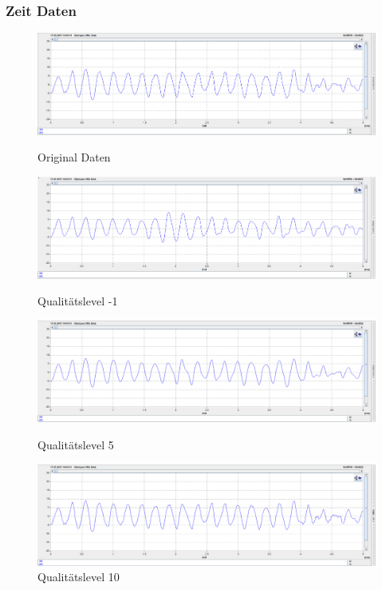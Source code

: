 \documentclass{article}
\begin{document}
{		
		\subsubsection{Zeit Daten}
		
			\begin{figure}
				
				\includegraphics[scale=0.4]{Bilder/1.png}
				\centering
				\vspace{0 cm}
				\caption{Original Daten}
				\label{fig12}	
				
				\includegraphics[scale=0.4]{Bilder/2.png}
				\centering
				\vspace{0 cm}
				\caption{Qualitätslevel -1}
				\label{fig13}	
				
				\includegraphics[scale=0.4]{Bilder/3.png}
				\centering
				\vspace{0 cm}
				\caption{Qualitätslevel 5}
				\label{fig14}	
				
				
				\includegraphics[scale=0.4]{Bilder/4.png}
				\centering
				\vspace{0 cm}
				\caption{Qualitätslevel 10}
				\label{fig15}
		

\end{figure}}
\end{document}
